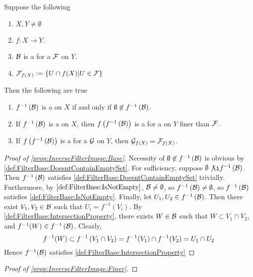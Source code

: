 \begin{prop}
\label{prop:InverseFilterImage}
Suppose the following
\begin{enumerate}
\item $X,Y \neq \emptyset$
\item $f:X \to Y$. 
\item $\mathcal{B}$ is a \FilterBase for a \Filter $\mathcal{F}$ on $Y$. 
\item $\mathcal{F}_{f(X)}:=\{U \cap f(X) | U \in \mathcal{F}\}$
\end{enumerate}
Then the following are true
\begin{enumerate}[label=(\roman*), ref={\ref{prop:InverseFilterImage}.~\roman*}]
    \item \label{prop:InverseFilterImage:Base}
    $f^{-1}\left( \mathcal{B}\right)$ is a \FilterBase on $X$ if and only if 
    $\emptyset \not \in f^{-1}\left( \mathcal{B}\right)$. 
    \item \label{prop:InverseFilterImage:Finer} If $f^{-1}\left( \mathcal{B}\right)$ is a \FilterBase on $X$, 
    then $f\left( f^{-1}\left( \mathcal{B}\right)\right)$ is a \FilterBase for a \Filter on $Y$ finer than $\mathcal{F}$. 
    \item \label{prop:InverseFilterImage:Subspace} If $f\left( f^{-1}\left( \mathcal{B}\right)\right)$ is a \FilterBase for a \Filter
    $\mathcal{G}$ on $Y$, then $\mathcal{G}_{f(X)}=\mathcal{F}_{f(X)}$. 
\end{enumerate}
\begin{proof}[Proof of \ref{prop:InverseFilterImage:Base}]
    Necessity of $\emptyset \not \in f^{-1}\left( \mathcal{B}\right)$ is obvious by 
    \ref{def:FilterBase:DoesntContainEmptySet}.
    For sufficiency, suppose $\emptyset \not \i f^{-1}\pa{\scB}$. 
    Then $f^{-1}\left( \mathcal{B}\right)$ satisfies \ref{def:FilterBase:DoesntContainEmptySet} trivially.
    Furthermore, by $\ref{def:FilterBase:IsNotEmpty}$, 
    $\mathcal{B} \neq \emptyset$, so $f^{-1}\left( \mathcal{B}\right) \neq \emptyset$, so 
    $f^{-1}\left( \mathcal{B}\right)$ satisfies \ref{def:FilterBase:IsNotEmpty}. 
    Finally, let $U_1,U_2 \in f^{-1}\left( \mathcal{B}\right)$. 
    Then there exist $V_1,V_2 \in \mathcal{B}$ such that 
    $U_i = f^{-1}(V_i)$. 
    By \ref{def:FilterBase:IntersectionProperty}, there exists $W \in \mathcal{B}$ such that
    $W \subset V_1 \cap V_2$, and $f^{-1}(W) \in f^{-1}\left( \mathcal{B}\right)$. 
    Clearly, 
    \begin{equation*}
        f^{-1}(W) \subset f^{-1}\left( V_1 \cap V_2\right) = f^{-1}(V_1) \cap f^{-1}(V_2) = U_1 \cap U_2
    \end{equation*}
    Hence $f^{-1}(\mathcal{B})$ satisfies \ref{def:FilterBase:IntersectionProperty}
\end{proof}
\begin{proof}[Proof of \ref{prop:InverseFilterImage:Finer}]

\end{proof}
\end{prop}
